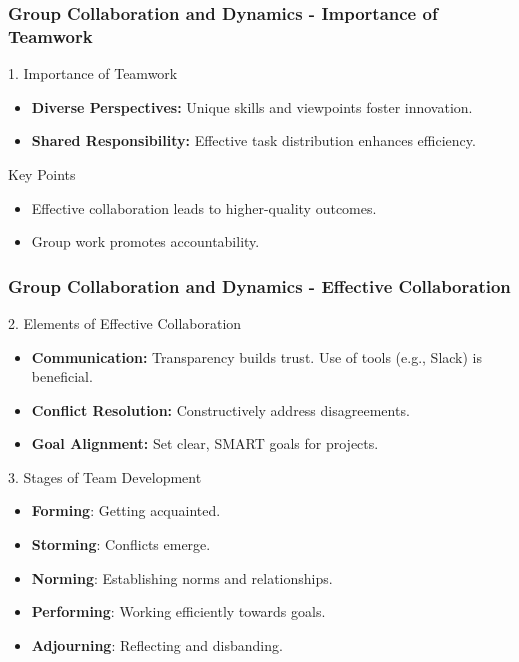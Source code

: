 \documentclass[aspectratio=169]{beamer}
\begin{document}
\begin{frame}[fragile]
  \frametitle{Group Collaboration and Dynamics - Importance of Teamwork}
  \begin{block}{1. Importance of Teamwork}
    \begin{itemize}
      \item \textbf{Diverse Perspectives:} Unique skills and viewpoints foster innovation.
      \item \textbf{Shared Responsibility:} Effective task distribution enhances efficiency.
    \end{itemize}
  \end{block}
  
  \begin{block}{Key Points}
    \begin{itemize}
      \item Effective collaboration leads to higher-quality outcomes.
      \item Group work promotes accountability.
    \end{itemize}
  \end{block}
\end{frame}

\begin{frame}[fragile]
  \frametitle{Group Collaboration and Dynamics - Effective Collaboration}
  \begin{block}{2. Elements of Effective Collaboration}
    \begin{itemize}
      \item \textbf{Communication:} Transparency builds trust. Use of tools (e.g., Slack) is beneficial.
      \item \textbf{Conflict Resolution:} Constructively address disagreements.
      \item \textbf{Goal Alignment:} Set clear, SMART goals for projects.
    \end{itemize}
  \end{block}
  
  \begin{block}{3. Stages of Team Development}
    \begin{itemize}
      \item \textbf{Forming}: Getting acquainted.
      \item \textbf{Storming}: Conflicts emerge.
      \item \textbf{Norming}: Establishing norms and relationships.
      \item \textbf{Performing}: Working efficiently towards goals.
      \item \textbf{Adjourning}: Reflecting and disbanding.
    \end{itemize}
  \end{block}
\end{frame}
\end{document}
